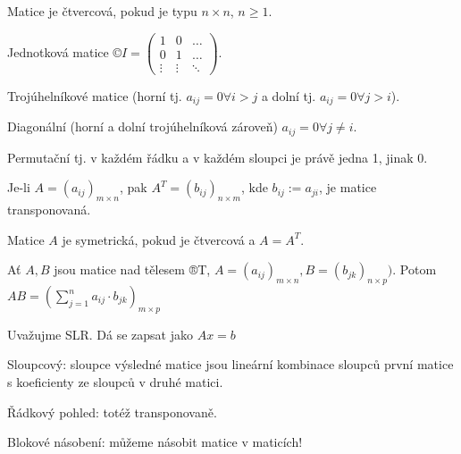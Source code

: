 \documentclass[12pt]{article}					%
\begin{document}
        \begin{definice}
            Matice je čtvercová, pokud je typu $n\times n$, $n≥1$.

            \begin{prikladyin}
                Jednotková matice $©I = \begin{pmatrix}1 & 0 & …\\0 & 1 & …\\ \vdots & \vdots & \ddots\end{pmatrix}$.

                Trojúhelníkové matice (horní tj. $a_{ij} = 0 \forall i>j$ a dolní tj. $a_{ij} = 0 \forall j>i$).

                Diagonální (horní a dolní trojúhelníková zároveň) $a_{ij} = 0 \forall j≠i$.

                Permutační tj. v každém řádku a v každém sloupci je právě jedna 1, jinak 0.
            \end{prikladyin}
        \end{definice}

        \begin{definice}
            Je-li $A = (a_{ij})_{m\times n}$, pak $A^T = (b_{ij})_{n\times m}$, kde $b_{ij} := a_{ji}$, je matice transponovaná.
        \end{definice}

        \begin{definice}
            Matice $A$ je symetrická, pokud je čtvercová a $A = A^T$.
        \end{definice}

        \begin{definice}
            Ať $A, B$ jsou matice nad tělesem ®T, $A=(a_{ij})_{m\times n}, B = (b_{jk})_{n\times p})$. Potom $AB = (\sum_{j=1}^n a_{ij} \cdot b_{jk})_{m\times p}$
        \end{definice}

        \begin{poznamka}
            Uvažujme SLR. Dá se zapsat jako $Ax = b$
        \end{poznamka}

        \begin{poznamka}
            Sloupcový: sloupce výsledné matice jsou lineární kombinace sloupců první matice s koeficienty ze sloupců v druhé matici.

            Řádkový pohled: totéž transponovaně.

            Blokové násobení: můžeme násobit matice v maticích!
        \end{poznamka}
\end{document}
